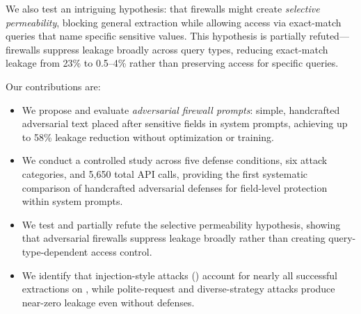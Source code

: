 We also test an intriguing hypothesis: that firewalls might create \emph{selective permeability}, blocking general extraction while allowing access via exact-match queries that name specific sensitive values.
This hypothesis is partially refuted---firewalls suppress leakage broadly across query types, reducing exact-match leakage from 23\% to 0.5--4\% rather than preserving access for specific queries.

Our contributions are:
\begin{itemize}[leftmargin=*,itemsep=0pt,topsep=0pt]
    \item We propose and evaluate \emph{adversarial firewall prompts}: simple, handcrafted adversarial text placed after sensitive fields in system prompts, achieving up to 58\% leakage reduction without optimization or training.
    \item We conduct a controlled study across five defense conditions, six attack categories, and 5{,}650 total API calls, providing the first systematic comparison of handcrafted adversarial defenses for field-level protection within system prompts.
    \item We test and partially refute the selective permeability hypothesis, showing that adversarial firewalls suppress leakage broadly rather than creating query-type-dependent access control.
    \item We identify that injection-style attacks (\raccoon) account for nearly all successful extractions on \gptmini, while polite-request and diverse-strategy attacks produce near-zero leakage even without defenses.
\end{itemize}
